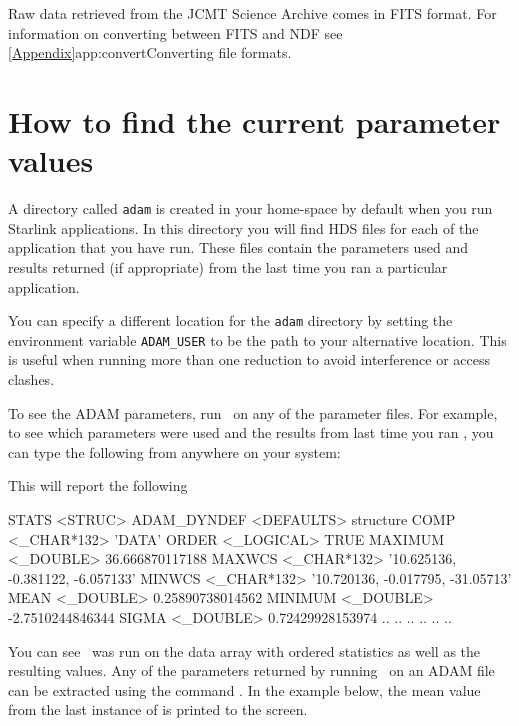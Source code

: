 \documentclass[11pt,oneside,chapters]{starlink}
\begin{document}
Raw data retrieved from the JCMT Science Archive comes in FITS format.
For information on converting between FITS and NDF see
\cref{Appendix}{app:convert}{Converting file formats}.

\section{How to find the current parameter values}
\label{sec:hdstrace}

A directory called \texttt{adam} is created in your home-space by
default when you run Starlink applications. In this directory you will
find HDS files for each of the application that you have run. These
files contain the parameters used and results returned (if
appropriate) from the last time you ran a particular application.

You can specify a different location for the \texttt{adam} directory
by setting the environment variable \texttt{ADAM\_USER} to be the path
to your alternative location. This is useful when running more than
one reduction to avoid interference or access clashes.

To see the ADAM parameters, run \hdstrace\ on any of the parameter
files. For example, to see which parameters were used and the results
from last time you ran \stats, you can type the following from
anywhere on your system:

\begin{terminalv}
\end{terminalv}

This will report the following
\begin{terminalv}
STATS  <STRUC>
   ADAM_DYNDEF    <DEFAULTS>      {structure}
   COMP           <_CHAR*132>     'DATA'
   ORDER          <_LOGICAL>      TRUE
   MAXIMUM        <_DOUBLE>       36.666870117188
   MAXWCS         <_CHAR*132>     '10.625136, -0.381122, -6.057133'
   MINWCS         <_CHAR*132>     '10.720136, -0.017795, -31.05713'
   MEAN           <_DOUBLE>       0.25890738014562
   MINIMUM        <_DOUBLE>       -2.7510244846344
   SIGMA          <_DOUBLE>       0.72429928153974
    ..               ..                 ..
    ..               ..                 ..
\end{terminalv}
\vspace{0.3cm}
You can see \stats\ was run on the data array with ordered statistics
as well as the resulting values. Any of the parameters returned by
running \hdstrace\ on an ADAM file can be extracted using the command
. In the example below, the mean value from the last
instance of  is printed to the screen.
\begin{terminalv}
\end{terminalv}
\end{document}
